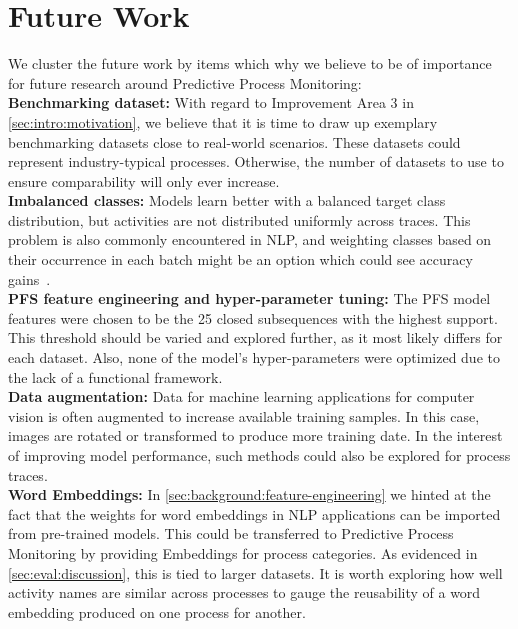 \section{Future Work} \label{sec:conclusion:future-work}
We cluster the future work by items which why we believe to be of importance for future research around Predictive Process Monitoring:\\

\noindent\textbf{Benchmarking dataset:} With regard to Improvement Area 3 in \autoref{sec:intro:motivation}, we believe that it is time to draw up exemplary benchmarking datasets close to real-world scenarios. These datasets could represent industry-typical processes. Otherwise, the number of datasets to use to ensure comparability will only ever increase.\\

\noindent\textbf{Imbalanced classes:} Models learn better with a balanced target class distribution, but activities are not distributed uniformly across traces. This problem is also commonly encountered in NLP, and weighting classes based on their occurrence in each batch might be an option which could see accuracy gains~\cite{web:stackoverflow-keras-class-weights}.\\

\noindent\textbf{PFS feature engineering and hyper-parameter tuning:} The PFS model features were chosen to be the 25 closed subsequences with the highest support. This threshold should be varied and explored further, as it most likely differs for each dataset. Also, none of the model's hyper-parameters were optimized due to the lack of a functional framework.\\

\noindent\textbf{Data augmentation:} Data for machine learning applications for computer vision is often augmented to increase available training samples. In this case, images are rotated or transformed to produce more training date. In the interest of improving model performance, such methods could also be explored for process traces.\\

\noindent\textbf{Word Embeddings:} In \autoref{sec:background:feature-engineering} we hinted at the fact that the weights for word embeddings in NLP applications can be imported from pre-trained models. This could be transferred to Predictive Process Monitoring by providing Embeddings for process categories. As evidenced in \autoref{sec:eval:discussion}, this is tied to larger datasets. It is worth exploring how well activity names are similar across processes to gauge the reusability of a word embedding produced on one process for another.

